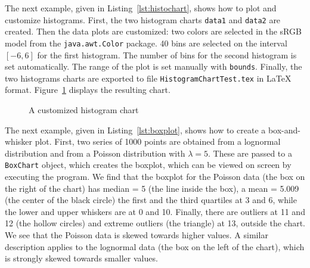 \begin{latexonly}

The next example, given in Listing~\ref{lst:histochart}, shows how to plot
and customize histograms. First, the two histogram charts \texttt{data1} and
\texttt{data2} are created. Then the data plots are customized: two colors
are selected in the sRGB model from the \texttt{java.awt.Color} package.
40 bins are selected on the interval $[-6, 6]$ for the first histogram.
The number of bins for the second histogram is set automatically.
The range of the plot is set manually with \texttt{bounds}.
 Finally, the two histograms
charts are exported  to file \texttt{HistogramChartTest.tex} in
\LaTeX{} format.  Figure~\ref{fig:histochart-res} displays the resulting chart.





\begin{figure}

\caption{A customized histogram chart\label{fig:histochart-res}}
\end{figure}



The next example, given in Listing~\ref{lst:boxplot}, shows how to create
a box-and-whisker plot. First, two series of 1000 points
are obtained from a lognormal distribution and from a Poisson distribution
with $\lambda=5$. These are passed to a \texttt{BoxChart} object, which
creates the boxplot, which can be viewed on screen by executing
the program. We find that the boxplot for the Poisson data (the box on the right
of the chart) has median = 5
(the line inside the box), a mean = 5.009 (the center of the black circle)
the first and the third quartiles at 3 and 6, while the lower and upper
whiskers are at 0 and 10. Finally, there are outliers at 11 and 12 (the hollow
circles) and extreme outliers (the triangle) at 13, outside the chart.
We see that the Poisson data is skewed towards higher values.
A similar description applies to the lognormal data (the box on the left
of the chart), which is strongly skewed towards smaller values.



\vspace{1cm}


\end{latexonly}
